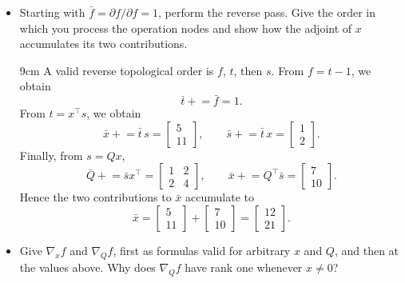 \begin{itemize}
    \item Starting with $\bar f=\partial f/\partial f=1$, perform the reverse
    pass. Give the order in which you process the operation nodes and show how
    the adjoint of $x$ accumulates its two contributions.

    \begin{solutionbox}{9cm}
        A valid reverse topological order is $f$, $t$, then $s$. From
        $f=t-1$, we obtain
        \[
            \bar t \mathrel{+}=\bar f=1.
        \]
        From $t=x^\top s$, we obtain
        \[
            \bar x \mathrel{+}=\bar t\,s
                =\begin{bmatrix}5\\11\end{bmatrix},
            \qquad
            \bar s \mathrel{+}=\bar t\,x
                =\begin{bmatrix}1\\2\end{bmatrix}.
        \]
        Finally, from $s=Qx$,
        \[
            \bar Q \mathrel{+}=\bar s x^\top
                =\begin{bmatrix}1&2\\2&4\end{bmatrix},
            \qquad
            \bar x \mathrel{+}=Q^\top\bar s
                =\begin{bmatrix}7\\10\end{bmatrix}.
        \]
        Hence the two contributions to $\bar x$ accumulate to
        \[
            \bar x=
            \begin{bmatrix}5\\11\end{bmatrix}
            +\begin{bmatrix}7\\10\end{bmatrix}
            =\begin{bmatrix}12\\21\end{bmatrix}.
        \]
    \end{solutionbox}

    \item Give $\nabla_x f$ and $\nabla_Q f$, first as formulas valid for
    arbitrary $x$ and $Q$, and then at the values above. Why does
    $\nabla_Q f$ have rank one whenever $x\ne0$?


\end{itemize}
